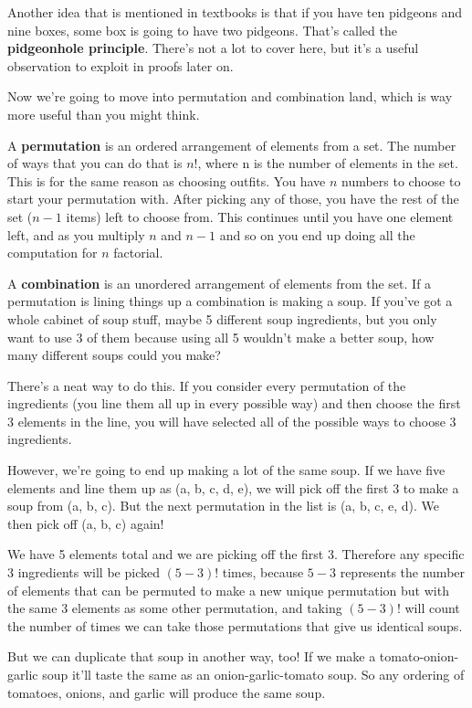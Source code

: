 \documentclass{article}
\begin{document}
    Another idea that is mentioned in textbooks is that if you have ten pidgeons and nine boxes, some box is going to have two pidgeons.
    That's called the \textbf{pidgeonhole principle}.
    There's not a lot to cover here, but it's a useful observation to exploit in proofs later on.

    Now we're going to move into permutation and combination land, which is way more useful than you might think.

    A \textbf{permutation} is an ordered arrangement of elements from a set.
    The number of ways that you can do that is $n!$, where n is the number of elements in the set.
    This is for the same reason as choosing outfits.
    You have $n$ numbers to choose to start your permutation with.
    After picking any of those, you have the rest of the set ($n-1$ items) left to choose from.
    This continues until you have one element left, and as you multiply $n$ and $n-1$ and so on you end up doing all the computation for $n$ factorial.

    A \textbf{combination} is an unordered arrangement of elements from the set.
    If a permutation is lining things up a combination is making a soup.
    If you've got a whole cabinet of soup stuff, maybe 5 different soup ingredients, but you only want to use 3 of them because using all 5 wouldn't make a better soup, how many different soups could you make?

    There's a neat way to do this.
    If you consider every permutation of the ingredients (you line them all up in every possible way)
    and then choose the first 3 elements in the line, you will have selected all of the possible ways to choose 3 ingredients.

    However, we're going to end up making a lot of the same soup.
    If we have five elements and line them up as (a, b, c, d, e), we will pick off the first 3 to make a soup from (a, b, c).
    But the next permutation in the list is (a, b, c, e, d). We then pick off (a, b, c) again!
    
    We have 5 elements total and we are picking off the first 3.
    Therefore any specific 3 ingredients will be picked $(5-3)!$ times, because $5-3$ represents the number of elements that can be permuted to make a new unique permutation but with the same 3 elements as some other permutation,
    and taking $(5-3)!$ will count the number of times we can take those permutations that give us identical soups.

    But we can duplicate that soup in another way, too!
    If we make a tomato-onion-garlic soup it'll taste the same as an onion-garlic-tomato soup.
    So any ordering of tomatoes, onions, and garlic will produce the same soup.
\end{document}

